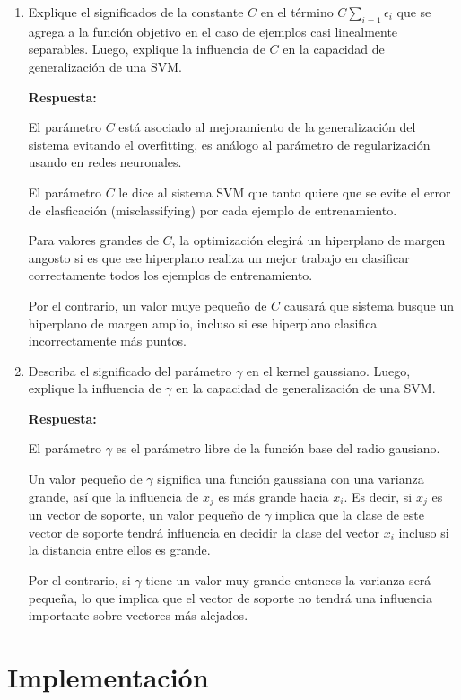 \documentclass[paper=a4, fontsize=11pt]{scrartcl}
\numberwithin{equation}{section}		%
\numberwithin{figure}{section}			%
\numberwithin{table}{section}				%
\begin{document}
\begin{enumerate}
    \item Explique el significados de la constante $C$ en el término $C\sum_{i=1}\epsilon_i$ que se agrega a la función objetivo en el caso de ejemplos casi linealmente separables. Luego, explique la influencia de $C$ en la capacidad de generalización de una SVM.
    
    \textbf{Respuesta:}
    
    El parámetro $C$ está asociado al mejoramiento de la generalización del sistema evitando el overfitting, es análogo al parámetro de regularización usando en redes neuronales.
    
    El parámetro $C$ le dice al sistema SVM que tanto quiere que se evite el error de clasficación (misclassifying) por cada ejemplo de entrenamiento. 
    
    Para valores grandes de $C$, la optimización elegirá un hiperplano de margen angosto si es que ese hiperplano realiza un mejor trabajo en clasificar correctamente todos los ejemplos de entrenamiento.
    
    Por el contrario, un valor muye pequeño de $C$ causará que sistema busque un hiperplano de margen amplio, incluso si ese hiperplano clasifica incorrectamente más puntos.
    
    \item Describa el significado del parámetro $\gamma$ en el kernel gaussiano. Luego, explique la influencia de $\gamma$ en la capacidad de generalización de una SVM.
    
    \textbf{Respuesta:}
    
    El parámetro $\gamma$ es el parámetro libre de la función base del radio gausiano.
    
    Un valor pequeño de $\gamma$ significa una función gaussiana con una varianza grande, así que la influencia de $x_j$ es más grande hacia $x_i$. Es decir, si $x_j$ es un vector de soporte, un valor pequeño de $\gamma$ implica que la clase de este vector de soporte tendrá influencia en decidir la clase del vector $x_i$ incluso si la distancia entre ellos es grande.
    
    Por el contrario, si $\gamma$ tiene un valor muy grande entonces la varianza será pequeña, lo que implica que el vector de soporte no tendrá una influencia importante sobre vectores más alejados.
    
\end{enumerate}

\newpage
\section{Implementación}
\end{document}
